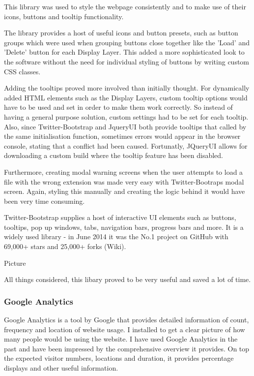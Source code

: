 \documentclass[a4paper,11pt,titlepage]{article}
\begin{document}
This library was used to style the webpage consistently and to make use of their icons, buttons and tooltip functionality.

The library provides a host of useful icons and button presets, such as button groups which were used when grouping buttons close together like the 'Load' and 'Delete' button for each Display Layer. This added a more sophisticated look to the software without the need for individual styling of buttons by writing custom CSS classes.

Adding the tooltips proved more involved than initially thought. For dynamically added HTML elements such as the Display Layers, custom tooltip options would have to be used and set in order to make them work correctly. So instead of having a general purpose solution, custom settings had to be set for each tooltip. Also, since Twitter-Bootstrap and JqueryUI both provide tooltips that called by the same initialisation function, sometimes errors would appear in the browser console, stating that a conflict had been caused. Fortunatly, JQueryUI allows for downloading a custom build where the tooltip feature has been disabled.

Furthermore, creating modal warning screens when the user attempts to load a file with the wrong extension was made very easy with Twitter-Bootraps modal screen. Again, styling this manually and creating the logic behind it would have been very time consuming.

Twitter-Bootstrap supplies a host of interactive UI elements such as buttons, tooltips, pop up windows, tabs, navigation bars, progress bars and more. It is a widely used library - in June 2014 it was the No.1 project on GitHub with 69,000+ stars and 25,000+ forks (Wiki).


Picture



All things considered, this libary proved to be very useful and saved a lot of time.




\subsubsection{Google Analytics}

Google Analytics is a tool by Google that provides detailed information of count, frequency and location of website usage. I installed to get a clear picture of how many people would be using the website. I have used Google Analytics in the past and have been impressed by the comprehensive overview it provides. On top the expected visitor numbers, locations and duration, it provides percentage displays and other useful information.
\end{document}
